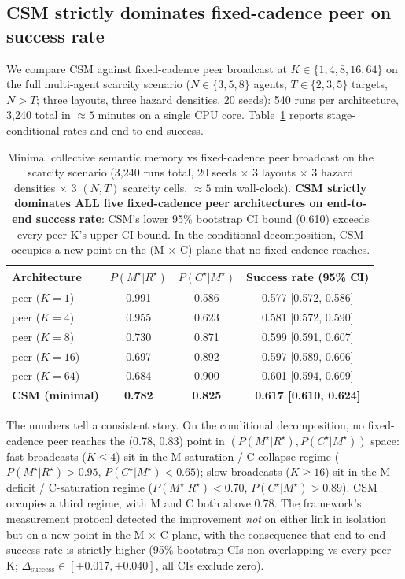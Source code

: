 \documentclass{article}
\begin{document}
\subsection{CSM strictly dominates fixed-cadence peer on success rate}
We compare CSM against fixed-cadence peer broadcast at $K \in \{1, 4, 8, 16, 64\}$ on the full multi-agent scarcity scenario ($N \in \{3,5,8\}$ agents, $T \in \{2,3,5\}$ targets, $N>T$; three layouts, three hazard densities, 20 seeds): 540 runs per architecture, 3{,}240 total in $\approx 5$ minutes on a single CPU core. Table~\ref{tab:csm-results} reports stage-conditional rates and end-to-end success.

\begin{table}[ht]
\caption{Minimal collective semantic memory vs fixed-cadence peer broadcast on the scarcity scenario (3{,}240 runs total, 20 seeds $\times$ 3 layouts $\times$ 3 hazard densities $\times$ 3 $(N,T)$ scarcity cells, $\approx 5$ min wall-clock). \textbf{CSM strictly dominates ALL five fixed-cadence peer architectures on end-to-end success rate}: CSM's lower 95\% bootstrap CI bound (0.610) exceeds every peer-K's upper CI bound. In the conditional decomposition, CSM occupies a new point on the (M$\,\times\,$C) plane that no fixed cadence reaches.}
\label{tab:csm-results}
\centering
\small
\begin{tabular}{l c c c}
\toprule
Architecture & $P(M^\star|R^\star)$ & $P(C^\star|M^\star)$ & Success rate (95\% CI) \\
\midrule
peer ($K{=}1$)  & 0.991 & 0.586 & 0.577 [0.572, 0.586] \\
peer ($K{=}4$)  & 0.955 & 0.623 & 0.581 [0.572, 0.590] \\
peer ($K{=}8$)  & 0.730 & 0.871 & 0.599 [0.591, 0.607] \\
peer ($K{=}16$) & 0.697 & 0.892 & 0.597 [0.589, 0.606] \\
peer ($K{=}64$) & 0.684 & 0.900 & 0.601 [0.594, 0.609] \\
\textbf{CSM (minimal)} & \textbf{0.782} & \textbf{0.825} & \textbf{0.617 [0.610, 0.624]} \\
\bottomrule
\end{tabular}
\end{table}

The numbers tell a consistent story. On the conditional decomposition, no fixed-cadence peer reaches the (0.78, 0.83) point in $(P(M^\star|R^\star), P(C^\star|M^\star))$ space: fast broadcasts ($K \le 4$) sit in the M-saturation / C-collapse regime ($P(M^\star|R^\star) > 0.95$, $P(C^\star|M^\star) < 0.65$); slow broadcasts ($K \ge 16$) sit in the M-deficit / C-saturation regime ($P(M^\star|R^\star) < 0.70$, $P(C^\star|M^\star) > 0.89$). CSM occupies a third regime, with M and C both above 0.78. The framework's measurement protocol detected the improvement \emph{not} on either link in isolation but on a new point in the M$\,\times\,$C plane, with the consequence that end-to-end success rate is strictly higher (95\% bootstrap CIs non-overlapping vs every peer-K; $\Delta_{\mathrm{success}}\!\in\![+0.017, +0.040]$, all CIs exclude zero).
\end{document}
